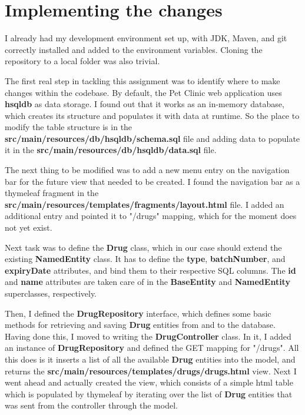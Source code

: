 \documentclass[12pt, a4paper]{article}
\begin{document}
\newpage
\section{Implementing the changes}
I already had my development environment set up, with JDK, Maven, and git correctly installed and added to the environment variables. Cloning the repository to a local folder was also trivial.

The first real step in tackling this assignment was to identify where to make changes within the codebase. By default, the Pet Clinic web application uses \textbf{hsqldb} as data storage. I found out that it works as an in-memory database, which creates its structure and populates it with data at runtime. So the place to modify the table structure is in the \textbf{src/main/resources/db/hsqldb/schema.sql} file and adding data to populate it in the \textbf{src/main/resources/db/hsqldb/data.sql} file.

The next thing to be modified was to add a new menu entry on the navigation bar for the future view that needed to be created. I found the navigation bar as a thymeleaf fragment in the \textbf{src/main/resources/templates/fragments/layout.html} file. I added an additional entry and pointed it to "/drugs" mapping, which for the moment does not yet exist.

Next task was to define the \textbf{Drug} class, which in our case should extend the existing \textbf{NamedEntity} class. It has to define the \textbf{type}, \textbf{batchNumber}, and \textbf{expiryDate} attributes, and bind them to their respective SQL columns. The \textbf{id} and \textbf{name} attributes are taken care of in the \textbf{BaseEntity} and \textbf{NamedEntity} superclasses, respectively.

Then, I defined the \textbf{DrugRepository} interface, which defines some basic methods for retrieving and saving \textbf{Drug} entities from and to the database. Having done this, I moved to writing the \textbf{DrugController} class. In it, I added an instance of \textbf{DrugRepository} and defined the GET mapping for "/drugs". All this does is it inserts a list of all the available \textbf{Drug} entities into the model, and returns the \textbf{src/main/resources/templates/drugs/drugs.html} view. Next I went ahead and actually created the view, which consists of a simple html table which is populated by thymeleaf by iterating over the list of \textbf{Drug} entities that was sent from the controller through the model.
\end{document}
